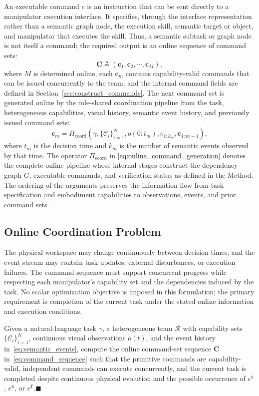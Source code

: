 An executable command $c$ is an instruction that can be sent directly to a
manipulator execution interface. It specifies, through the interface
representation rather than a semantic graph node, the execution skill, semantic
target or object, and manipulator that executes the skill. Thus, a semantic
subtask or graph node is not itself a command; the required output is an online
sequence of command sets:
\begin{equation}
 \mathbf{C}\triangleq
 (\mathbf{c}_1,\mathbf{c}_2,\cdots,\mathbf{c}_M),
 \label{eq:command_sequence}
\end{equation}
where $M$ is determined online, each $\mathbf{c}_m$ contains capability-valid
commands that can be issued concurrently to the team, and the internal command
fields are defined in Section~\ref{sec:construct_commands}. The next command
set is generated online by the role-shared coordination
pipeline from the task, heterogeneous capabilities, visual history, semantic
event history, and previously issued command sets:
\begin{equation}
 \mathbf{c}_m=
 \Pi_{\mathrm{coord}}\!\left(
 \gamma,\{\mathcal{C}_i\}_{i=1}^{N},o(0\!:\!t_m),
 e_{1:k_m},\mathbf{c}_{1:m-1}\right),
 \label{eq:online_command_generation}
\end{equation}
where $t_m$ is the decision time and $k_m$ is the number of semantic events
observed by that time. The operator $\Pi_{\mathrm{coord}}$ in
\eqref{eq:online_command_generation} denotes the
complete online pipeline whose internal stages construct the dependency graph
$G$, executable commands, and verification status as defined
in the Method. The ordering of the arguments preserves the information flow
from task specification and embodiment capabilities to observations, events,
and prior command sets.

\subsection{Online Coordination Problem}
\label{sec:coordination_problem}

The physical workspace may change continuously between decision times, and the
event stream may contain task updates, external disturbances, or execution
failures. The command sequence must support concurrent progress while
respecting each manipulator's capability set and the dependencies induced by the
task. No scalar optimization objective is imposed in this formulation; the
primary requirement is completion of the current task under the stated online
information and execution conditions.

\begin{problem}
Given a natural-language task $\gamma$, a heterogeneous team $\mathcal{R}$ with
capability sets $\{\mathcal{C}_i\}_{i=1}^{N}$, continuous visual observations
$o(t)$, and the event history in~\eqref{eq:semantic_events}, compute the online
command-set sequence $\mathbf{C}$ in~\eqref{eq:command_sequence} such that
the primitive commands are capability-valid, independent commands can execute
concurrently, and the current task is completed despite continuous physical
evolution and the possible occurrence of $e^{\texttt{t}}$, $e^{\texttt{x}}$,
or $e^{\texttt{f}}$.\hfill $\blacksquare$
\end{problem}
